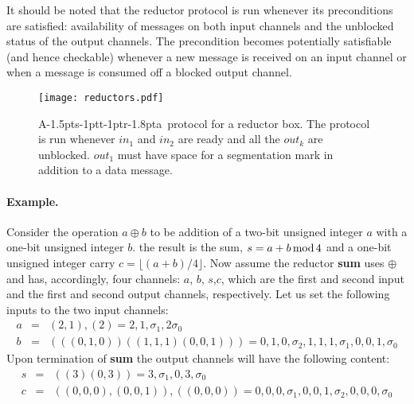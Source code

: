 \documentclass[11pt]{report}
\def\ak{{\textsf{A\kern-1.5pts\kern-1ptt\kern-1ptr\kern-1.8pta}}\kern-2pt{\it K\kern-2ptahn}}
\begin{document}
It should be noted that the reductor protocol is run whenever its preconditions are satisfied: availability of messages on both input channels and the unblocked status of the output channels. The precondition becomes potentially satisfiable (and hence checkable) whenever a new message is received on an input channel or when a message is consumed off a blocked output channel.


\begin{figure}
\texttt{[image: reductors.pdf]}\\
\vspace{-1in}
\caption{\ak\ protocol for a reductor box. The protocol is run whenever $in_1$ and $in_2$ are ready and
all the $out_k$ are unblocked. $out_1$ must have space for a segmentation mark in addition to a data message.
\label{fig:reductors}}
\end{figure}


\paragraph{Example.}

Consider the operation $a\oplus b$ to be addition of a two-bit unsigned integer $a$ with a one-bit unsigned integer $b$. the result is the sum, $s=a+b \,{\rm mod\,} 4$ and a one-bit unsigned integer carry $c = \lfloor (a+b)/4\rfloor$. Now assume the reductor {\bf sum} uses $\oplus$ and has, accordingly, four channels: $a$, $b$, $s$,$c$, which are the first and second input and the first and second output channels, respectively. Let us set the following inputs to the two input channels:
\begin{eqnarray}
a & = & (2,1),(2) = 2, 1, \sigma_1, 2 \sigma_0 \nonumber\\
b & = & (((0,1,0))((1,1,1)(0,0,1))) = 0,1,0, \sigma_2, 1,1,1,\sigma_1, 0,0,1,\sigma_0 \nonumber
\end{eqnarray}
Upon termination of {\bf sum} the output channels will have the following content:
\begin{eqnarray}
s & = &  ((3)(0,3)) = 3,\sigma_1, 0,3,\sigma_0    \nonumber\\
c & = & ((0,0,0),(0,0,1)),((0,0,0)) = 0,0,0,\sigma_1,0,0,1,\sigma_2,0,0,0,\sigma_0 \nonumber
\end{eqnarray}
\end{document}
